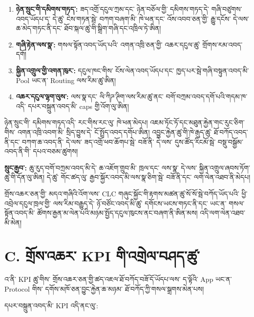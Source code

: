 \documentclass[11pt]{article}
\begin{document}
\begin{enumerate}[leftmargin=*]
\item \textbf{ཉེན་སྲུང་གི་དམིགས་གཏད་:} ཟད་འགྲོ་དངུལ་ཀྲམ་དང་ ཉེན་བཅོལ་གྱི་ དམིགས་གཏད་དེ་ གཞི་བཙུགས་འབད་ཡོདཔ་ད་ དེ་ཚུ་ ངེས་གཏན་སྦེ་ བཀག་བཞག་མི་ ཁེ་ཕན་དང་ འོས་འབབ་ཅན་གྱི་ རྒྱུ་དངོས་ དེ་ལས་ ཆ་མེད་གཏང་ནི་དང་ ཐོབ་སྐལ་ཚུ་གི་སྒྲིག་གཞི་དང་འཁྲིལ་ཏེ་ཨིན།
\item \textbf{གཞི་རྟེན་ལས་སྣ་:} གསལ་སྟོན་འབད་ཡོད་པའི་ འགན་འཁྲི་ཅན་གྱི་ འཆར་དངུལ་ཚུ་ གྲོགས་རམ་འབད་དགོ།
\item \textbf{སྐྱིན་འགྲུལ་གྱི་འགན་ཁུར་:} དངུལ་ཁང་གིས་ ངོས་ལེན་འབད་ཡོདཔ་དང་ ཁྱད་པར་སྦེ་གཞི་བསྟུན་འབད་མི་ Pool ཡང་ན་ Routing ལས་རིམ་ཚུ་ཨིན།
\item \textbf{འཆར་དངུལ་ལྷག་ལུས་:} ལས་སྣ་དང་ ལི་ཀིཌ་ཊིག་ལས་རིམ་ཚུ་ནང་ བགོ་བཀྲམ་འབད་དགོ་པའི་གདམ་ཁ་འདི་ དཔར་བསྐྲུན་འབད་མི་ caps གྱི་འོག་ལུ་ཨིན།
\end{enumerate}
ཉེན་སྲུང་གི་ དམིགས་གཏད་འདི་ རང་གིས་རང་ལུ་ ཁེ་ཕན་མེདཔ། འཇམ་ཏོང་ཏོ་དང་མཐུན་རྐྱེན་གང་རུང་ཅིག་གིས་ འགན་འཁྲི་འབག་མི་ སྲིད་བྱུས་དེ་ ངོ་སྤྲོད་འབད་དགོཔ་ཨིན། འབྱུང་རྐྱེན་ཚུ་གི་ཁེ་རྒུད་ཚུ་ ཐོ་བཀོད་འབད་ནི་དང་ བཀག་ཆ་འབད་ནི་ དེ་ལས་ ཟད་འགྲོ་ཕབ་ཆོགཔ་སྦེ་ བཟོ་ནི་ དེ་ལས་ དུས་ཚོད་རིངམོ་སྦེ་ བསྡུ་བསྒྱོམ་འབད་ནི་གི་ དཔའ་བཅམ་ཚུགས།

\textbf{སྲུང་རྒྱབ་:} ཆུ་རུད་བགོ་བཀྲམ་འབད་མི་དེ་ ཆ་འཇོག་གྲུབ་མི་ ཁྲལ་དང་ ལས་སྣ་ དེ་ལས་ སྐྱིན་འགྲུལ་ཞབས་ཏོག་ཚུ་གི་དོན་ལུ་ཨིན། དེ་ཚུ་ གོང་ཚད་ལུ་ རྒྱབ་སྐྱོར་འབད་མི་ལས་སྣ་ཅིག་སྦེ་ བཟོ་ནི་དང་ ལག་ལེན་འཐབ་ནི་མེདཔ།

གྲོས་འཆར་ཅན་གྱི་ མདའ་གཞིའི་འོག་ལས་ CLC གཞུང་སྐྱོང་གི་རྟགས་མཚན་ཚུ་སོ་སོ་སྦེ་བཀོད་ཡོད་པའི་ ཕྱི་འབྲེལ་དངུལ་ཁྲལ་གྱི་ ལས་རིམ་བརྒྱུད་དེ་ ཉོ་བཙོང་འབད་མི་ཚུ་ དགོངས་ཡངས་གཏང་ནི་དང་ ཡང་ན་ གསལ་སྟོན་འབད་མི་ ཚོགས་རྒྱན་མ་ལེན་པའི་མཉམ་སྤྱོད་དངུལ་ཁུངས་ནང་བཞག་ནི་ཨིན་མས། འདི་ལག་ལེན་འཐབ་མི་མེན།


\section*{C. གྲོས་འཆར་ KPI གི་འགྲེལ་བཤད་ཚུ་}

འ་ནི་ KPI ཚུ་གིས་ གྲོས་འཆར་ཅན་གྱི་ཚད་འཇལ་ཐོ་བཀོད་བཟོ་དོ་ཡོདཔ་ལས་ ད་ལྟོའི་ App ཡང་ན་ Protocol གིས་ དགོས་མཁོ་ཅན་བྱུང་རྐྱེན་ཆ་མཉམ་ ཐོ་བཀོད་ཀྱི་གསལ་སྒྲགས་མེན་པས།

དཔར་བསྐྲུན་འབད་མི་ KPI འདི་ནང་ལུ་:
\end{document}
